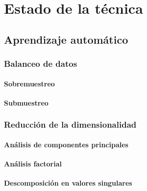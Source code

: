\chapter{Estado de la técnica}
\label{ch:estado_tecnica}



\section{Aprendizaje automático}
\label{sec:aprend_auto}



\subsection{Balanceo de datos}
\label{subsec:balanceo}



\subsubsection{Sobremuestreo}
\label{subsubsec:oversampling}



\subsubsection{Submuestreo}
\label{subsubsec:undersampling}



\subsection{Reducción de la dimensionalidad}
\label{subsec:red_dim}



\subsubsection{Análisis de componentes principales}
\label{subsubsec:pca}



\subsubsection{Análisis factorial}
\label{subsubsec:fa}



\subsubsection{Descomposición en valores singulares}
\label{subsubsec:svd}



